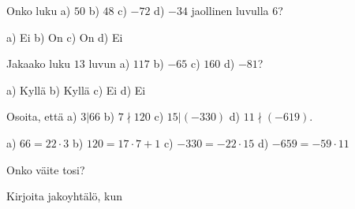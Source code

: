 \begin{tehtavasivu}

\begin{tehtava}
    Onko luku a) $50$ b) $48$ c) $-72$ d) $-34$ jaollinen luvulla $6$?
    \begin{vastaus}
        a) Ei b) On c) On d) Ei
    \end{vastaus}

\end{tehtava}

\begin{tehtava}
    Jakaako luku $13$ luvun a) $117$ b) $-65$ c) $160$ d) $-81$?
    \begin{vastaus}
        a) Kyllä b) Kyllä c) Ei d) Ei 
    \end{vastaus}
\end{tehtava}

\begin{tehtava}
    Osoita, että a) $3|66$ b) $7\nmid 120$ c) $15|(-330)$ d) $11\nmid (-619)$.
    \begin{vastaus}
        a) $66 = 22\cdot 3$ b) $120 = 17\cdot 7 + 1$ c) $-330 = -22\cdot 15$ d) $-659 = -59\cdot 11$ 
    \end{vastaus}

\end{tehtava}

\begin{tehtava}
    Onko väite tosi?
    
    \begin{vastaus}
    \end{vastaus}
\end{tehtava}

\begin{tehtava}
    Kirjoita jakoyhtälö, kun
    
    \begin{vastaus}
    \end{vastaus}
\end{tehtava}


\end{tehtavasivu}
